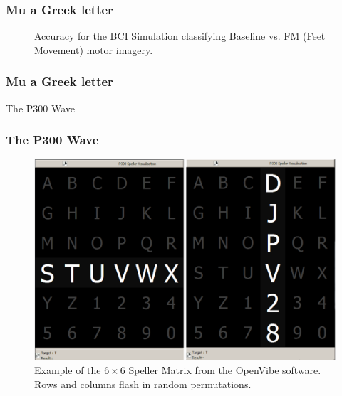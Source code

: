 \documentclass[aspectratio=169]{beamer}
\begin{document}
	
	\begin{frame}
	\frametitle{Mu a Greek letter}
   \begin{figure}[thpb]
      \centering
      \setlength\fboxsep{0pt}
	  \setlength\fboxrule{0.5pt}
      \caption{\centering Accuracy for the BCI Simulation classifying Baseline vs. FM (Feet Movement) motor imagery.}
      \label{figure3}
   \end{figure} 	
	\end{frame}	  
	    
\begin{frame}
\frametitle{Mu a Greek letter}
\begin{center}
\LARGE The P300 Wave
\end{center}
\end{frame}

\begin{frame}
\frametitle{The P300 Wave}
\begin{figure}[h!]
\centering
\includegraphics[scale=0.3]{images/openvibep300matrix.png}
\caption[P300 Speller Matrix]{Example of the $6 \times 6$ Speller Matrix from the OpenVibe software.  Rows and columns flash in random permutations.}
\label{fig:p300matrix}
\end{figure}

\end{frame}    
\end{document}
